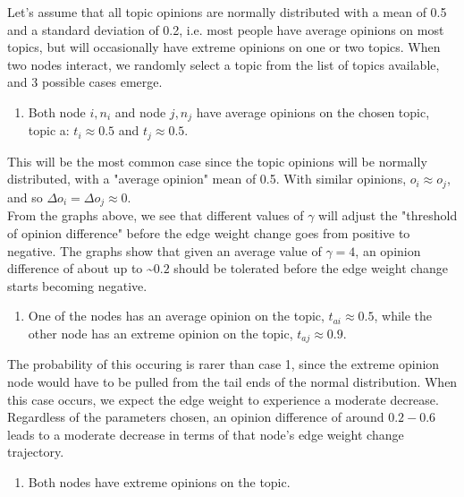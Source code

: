 \documentclass[11pt]{article}
\providecommand{\tightlist}{%
      \setlength{\itemsep}{0pt}\setlength{\parskip}{0pt}}
\begin{document}
Let's assume that all topic opinions are normally distributed with a
mean of 0.5 and a standard deviation of 0.2, i.e. most people have
average opinions on most topics, but will occasionally have extreme
opinions on one or two topics. When two nodes interact, we randomly
select a topic from the list of topics available, and 3 possible cases
emerge.

\begin{enumerate}
\def\labelenumi{\arabic{enumi})}
\tightlist
\item
  Both node \(i, n_i\) and node \(j, n_j\) have average opinions on the
  chosen topic, topic a: \(t_{i} \approx 0.5\) and
  \(t_{j} \approx 0.5\).
\end{enumerate}

This will be the most common case since the topic opinions will be
normally distributed, with a "average opinion" mean of 0.5. With similar
opinions, \(o_i \approx o_j\), and so
\(\Delta o_i = \Delta o_j \approx 0\).\\

From the graphs above, we see that different values of \(\gamma\) will
adjust the "threshold of opinion difference" before the edge weight
change goes from positive to negative. The graphs show that given an
average value of \(\gamma=4\), an opinion difference of about up to
\textasciitilde{}\(0.2\) should be tolerated before the edge weight
change starts becoming negative.

\begin{enumerate}
\def\labelenumi{\arabic{enumi})}
\setcounter{enumi}{1}
\tightlist
\item
  One of the nodes has an average opinion on the topic,
  \(t_{ai} \approx 0.5\), while the other node has an extreme opinion on
  the topic, \(t_{aj} \approx 0.9\).
\end{enumerate}

The probability of this occuring is rarer than case 1, since the extreme
opinion node would have to be pulled from the tail ends of the normal
distribution. When this case occurs, we expect the edge weight to
experience a moderate decrease. Regardless of the parameters chosen, an
opinion difference of around \(0.2 - 0.6\) leads to a moderate decrease
in terms of that node's edge weight change trajectory.

\begin{enumerate}
\def\labelenumi{\arabic{enumi})}
\setcounter{enumi}{2}
\tightlist
\item
  Both nodes have extreme opinions on the topic.
\end{enumerate}
\end{document}
